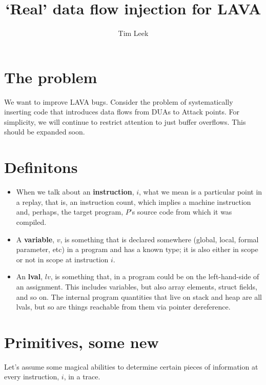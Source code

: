 \documentclass{article}
\title{`Real' data flow injection for LAVA}
\author{Tim Leek}
\begin{document}
\maketitle

\section{The problem}
We want to improve LAVA bugs.  Consider the problem of systematically inserting code that introduces data flows from DUAs to Attack points.  For simplicity, we will continue to restrict attention to just buffer overflows.  This should be expanded soon. 

\section{Definitons}

\begin{itemize}

\item When we talk about an \textbf{instruction}, $i$, what we mean is a particular point in a replay, that is, an instruction count, which implies a machine instruction and, perhaps, the target program, $P$'s source code from which it was compiled.

\item A \textbf{variable}, $v$, is something that is declared somewhere (global, local, formal parameter, etc) in a program and has a known type; it is also either in scope or not in scope at instruction $i$.  

\item An \textbf{lval}, $lv$, is something that, in a program could be on the left-hand-side of an assignment.  This includes variables, but also array elements, struct fields, and so on.  The internal program quantities that live on stack and heap are all lvals, but so are things reachable from them via pointer dereference.

\end{itemize}

\section{Primitives, some new}

Let's assume some magical abilities to determine certain pieces of information at every instruction, $i$,  in a trace.
\end{document}
